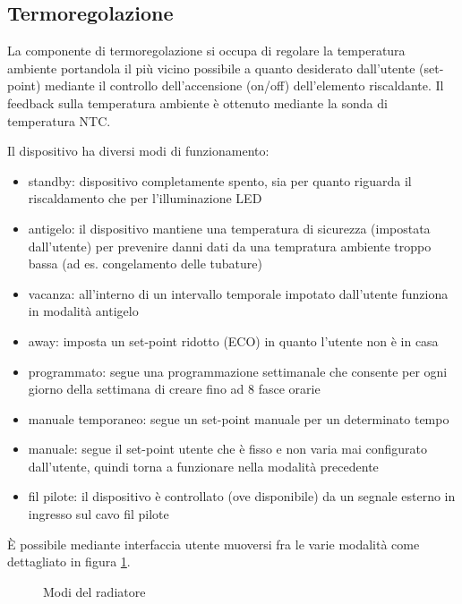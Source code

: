 \documentclass{article}
\begin{document}
\subsection{Termoregolazione}

La componente di termoregolazione si occupa di regolare la temperatura ambiente portandola
il più vicino possibile a quanto desiderato dall'utente (set-point) mediante
il controllo dell'accensione (on/off) dell'elemento riscaldante. Il feedback sulla
temperatura ambiente è ottenuto mediante la sonda di temperatura NTC.

Il dispositivo ha diversi modi di funzionamento:
\begin{itemize}
    \item standby: dispositivo completamente spento, sia per quanto riguarda il riscaldamento
        che per l'illuminazione LED
    \item antigelo: il dispositivo mantiene una temperatura di sicurezza (impostata dall'utente)
        per prevenire danni dati da una tempratura ambiente troppo bassa (ad es. congelamento delle tubature)
    \item vacanza: all'interno di un intervallo temporale impotato dall'utente funziona
        in modalità antigelo
    \item away: imposta un set-point ridotto (ECO) in quanto l'utente non è in casa
    \item programmato: segue una programmazione settimanale che consente per ogni
        giorno della settimana di creare fino ad 8 fasce orarie
    \item manuale temporaneo: segue un set-point manuale per un determinato tempo
    \item manuale: segue il set-point utente che è fisso e non varia mai
        configurato dall'utente, quindi torna a funzionare nella modalità precedente
    \item fil pilote: il dispositivo è controllato (ove disponibile) da un segnale
        esterno in ingresso sul cavo fil pilote
\end{itemize}

È possibile mediante interfaccia utente muoversi fra le varie modalità come dettagliato
in figura \ref{modi}.

\begin{figure}[ht]
    \centering
    \caption{Modi del radiatore}
    \label{modi}
\end{figure}
\end{document}
